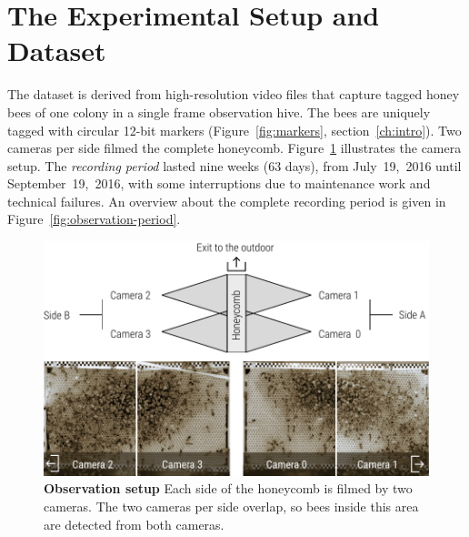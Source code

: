 \section{The Experimental Setup and Dataset}

The dataset is derived from high-resolution video files that capture tagged honey bees of one colony in a single frame observation hive.
The bees are uniquely tagged with circular 12-bit markers (Figure~\ref{fig:markers}, section~\ref{ch:intro}).
Two cameras per side filmed the complete honeycomb.
Figure~\ref{fig:obssetup} illustrates the camera setup.
The \emph{recording period} lasted nine weeks (63 days), from July~19,~2016 until September~19,~2016, with some interruptions due to maintenance work and technical failures.
An overview about the complete recording period is given in Figure~\ref{fig:observation-period}.

\begin{figure}[htbp]
	\centering
	\includegraphics[width=1.0\textwidth]{Figures/setupCams}
 	\caption[Observation setup]{\textbf{Observation setup} Each side of the honeycomb is filmed by two cameras. The two cameras per side overlap, so bees inside this area are detected from both cameras.}
 	\label{fig:obssetup}
\end{figure}

